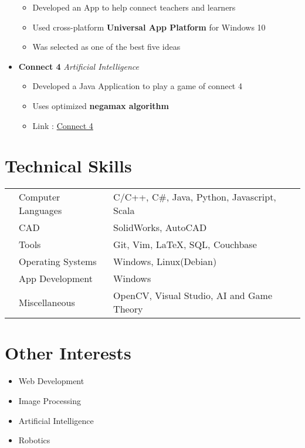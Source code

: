 \documentclass[11pt,a4paper]{moderncv}
\newcommand{\experience}[3]{
  \item \textbf{\large{#1}} \hfill \emph{#3} \hfill \textit{#2}
}
\begin{document}
\begin{itemize}
      \begin{itemize}
        \item Developed an App to help connect teachers and learners
        \item Used cross-platform \textbf{Universal App Platform} for Windows 10
        \item Was selected as one of the best five ideas
      \end{itemize}
      \experience{Connect 4}{}{Artificial Intelligence}
      \begin{itemize}
        \item Developed a Java Application to play a game of connect 4
        \item Uses optimized \textbf{negamax algorithm}
        \item Link : \href{http://github.com/yashsriv/Connect-4}{Connect 4}
      \end{itemize}
    \end{itemize}
  \section{Technical Skills}
  \begin{tabular}{L{0.05cm} L{6cm} l}
      & Computer Languages   & C/C++, C\#, Java, Python, Javascript, Scala\\
      & CAD                  & SolidWorks, AutoCAD \\
      & Tools                & Git, Vim, \LaTeX, SQL, Couchbase \\
      & Operating Systems    & Windows, Linux(Debian)\\
      & App Development      & Windows \\
      & Miscellaneous        & OpenCV, Visual Studio, AI and Game Theory
    \end{tabular}
  \section{Other Interests}
    \begin {itemize}
      \item Web Development
      \item Image Processing
      \item Artificial Intelligence
      \item Robotics
    \end{itemize}
\end{document}
